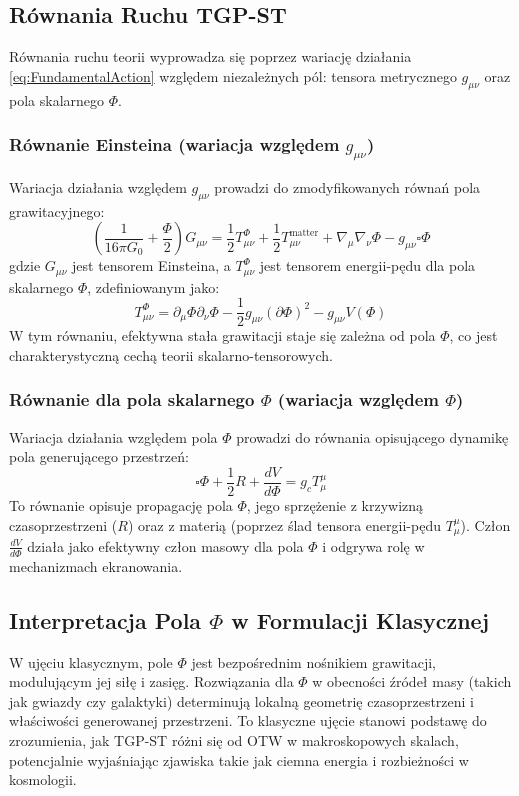 \documentclass[11pt,a4paper]{article}
\begin{document}
\subsection{Równania Ruchu TGP-ST}
Równania ruchu teorii wyprowadza się poprzez wariację działania \eqref{eq:FundamentalAction} względem niezależnych pól: tensora metrycznego $g_{\mu\nu}$ oraz pola skalarnego $\Phi$.

\subsubsection{Równanie Einsteina (wariacja względem $g_{\mu\nu}$)}
Wariacja działania względem $g_{\mu\nu}$ prowadzi do zmodyfikowanych równań pola grawitacyjnego:
\begin{equation}
    \left(\frac{1}{16\pi G_0} + \frac{\Phi}{2}\right) G_{\mu\nu} = \frac{1}{2}T^{\Phi}_{\mu\nu} + \frac{1}{2}T^{\text{matter}}_{\mu\nu} + \nabla_\mu\nabla_\nu\Phi - g_{\mu\nu}\square\Phi
    \label{eq:EinsteinTGP}
\end{equation}
gdzie $G_{\mu\nu}$ jest tensorem Einsteina, a $T^{\Phi}_{\mu\nu}$ jest tensorem energii-pędu dla pola skalarnego $\Phi$, zdefiniowanym jako:
\begin{equation}
    T^{\Phi}_{\mu\nu} = \partial_\mu\Phi \partial_\nu\Phi - \frac{1}{2}g_{\mu\nu}(\partial\Phi)^2 - g_{\mu\nu}V(\Phi)
\end{equation}
W tym równaniu, efektywna stała grawitacji staje się zależna od pola $\Phi$, co jest charakterystyczną cechą teorii skalarno-tensorowych.

\subsubsection{Równanie dla pola skalarnego $\Phi$ (wariacja względem $\Phi$)}
Wariacja działania względem pola $\Phi$ prowadzi do równania opisującego dynamikę pola generującego przestrzeń:
\begin{equation}
    \square\Phi + \frac{1}{2}R + \frac{dV}{d\Phi} = g_{c} T^\mu_\mu
    \label{eq:ScalarFieldEquation}
\end{equation}
To równanie opisuje propagację pola $\Phi$, jego sprzężenie z krzywizną czasoprzestrzeni ($R$) oraz z materią (poprzez ślad tensora energii-pędu $T^\mu_\mu$). Człon $\frac{dV}{d\Phi}$ działa jako efektywny człon masowy dla pola $\Phi$ i odgrywa rolę w mechanizmach ekranowania.

\subsection{Interpretacja Pola $\Phi$ w Formulacji Klasycznej}
W ujęciu klasycznym, pole $\Phi$ jest bezpośrednim nośnikiem grawitacji, modulującym jej siłę i zasięg. Rozwiązania dla $\Phi$ w obecności źródeł masy (takich jak gwiazdy czy galaktyki) determinują lokalną geometrię czasoprzestrzeni i właściwości generowanej przestrzeni. To klasyczne ujęcie stanowi podstawę do zrozumienia, jak TGP-ST różni się od OTW w makroskopowych skalach, potencjalnie wyjaśniając zjawiska takie jak ciemna energia i rozbieżności w kosmologii.
\end{document}
